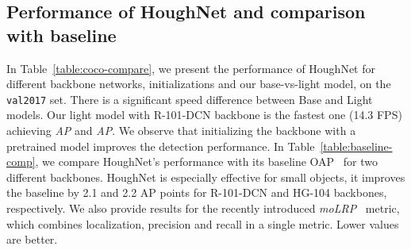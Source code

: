 \documentclass[runningheads]{llncs}
\begin{document}
\subsection{Performance of HoughNet and comparison with baseline}
In Table~\ref{table:coco-compare}, we present the performance of HoughNet for different backbone networks, initializations and  our base-vs-light model, on the \texttt{val2017} set. There is a significant speed difference between Base and Light models. Our light model with R-101-DCN backbone is the fastest one (14.3 FPS) achieving  \textit{AP} and  \textit{AP}. We observe that initializing the backbone with a pretrained model improves the detection performance.  In Table~\ref{table:baseline-comp}, we compare HoughNet’s performance with its baseline OAP~\cite{centernet} for two different backbones. HoughNet is especially effective for small objects, it improves the baseline by 2.1 and 2.2 AP points for R-101-DCN and HG-104 backbones, respectively. We also provide results for the recently introduced \textit{moLRP}~\cite{lrp} metric, which combines localization, precision and recall in a single metric. Lower values are better. 
\end{document}
